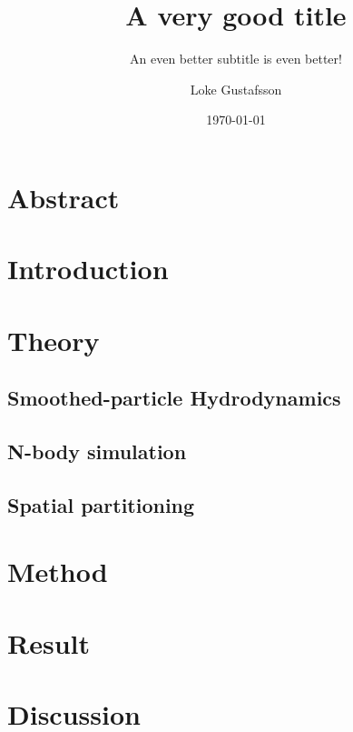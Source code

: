 \documentclass{report}
\title{A very good title}
\subtitle{An even better subtitle is even better!}
\author{Loke Gustafsson}
\date{\today}
\begin{document}


\chapter*{Abstract}
    

\tableofcontents

\chapter{Introduction}
    

\chapter{Theory}
    \section{Smoothed-particle Hydrodynamics}
    

    \section{N-body simulation}
    

    \section{Spatial partitioning}
    

\chapter{Method}
    

\chapter{Result}
    

\chapter{Discussion}
    

\printbibliography[heading=bibintoc,title={References}]
\end{document}
